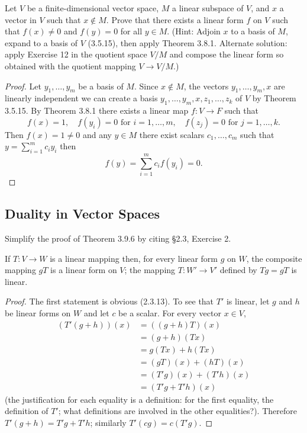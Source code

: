 \begin{tcolorbox}[title=Exercise 13, breakable]
    Let $V$ be a finite-dimensional vector space, $M$ a linear subspace of $V$, 
    and $x$ a vector in $V$ such that $x \notin M$. Prove that there exists a linear 
    form $f$ on $V$ such that $f(x) \ne 0$ and $f(y) = 0$ for all $y \in M$. 
    (Hint: Adjoin $x$ to a basis of $M$, expand to a basis of $V$ (3.5.15), then apply 
    Theorem 3.8.1. Alternate solution: apply Exercise 12 in the quotient 
    space $V/M$ and compose the linear form so obtained with the quotient 
    mapping $V \to V/M$.)
\end{tcolorbox}

\begin{proof}
    Let $y_1, \ldots, y_m$ be a basis of $M$. Since $x \notin M$, the vectors
    $y_1, \ldots, y_m, x$ are linearly independent we can create a basis
    $y_1, \ldots, y_m, x, z_1, \ldots, z_k$ of $V$ by Theorem 3.5.15.
    By Theorem 3.8.1 there exists a linear map $f : V \to F$ such that 
    \[f(x) = 1, \quad f(y_i) = 0 \text{ for } i = 1, \ldots, m, \quad f(z_j) = 0 \text{ for } j = 1, \ldots, k.\]
    Then $f(x) = 1 \ne 0$ and any $y \in M$ there exist scalars $c_1, \ldots, c_m$ such that
    $y = \sum_{i=1}^m c_i y_i$ then
    \[f(y) = \sum_{i=1}^m c_i f(y_i) = 0.\]
\end{proof}

\subsection{Duality in Vector Spaces}

\begin{tcolorbox}[title=Exercise 1, breakable]
    Simplify the proof of Theorem 3.9.6 by citing \S 2.3, Exercise 2.
\end{tcolorbox}

\begin{theorem}
    If $T : V \longrightarrow W$ is a linear mapping then, for every linear form 
    $g$ on $W$, the composite mapping $gT$ is a linear form on $V$; the mapping 
    $T : W' \longrightarrow V'$ defined by $Tg = gT$ is linear.
\end{theorem}

\begin{proof}
The first statement is obvious (2.3.13). To see that $T'$ is linear, let $g$ and $h$ be linear forms on $W$ and let $c$ be a scalar. For every vector $x \in V$,
\begin{align*}
(T'(g + h))(x) &= ((g + h)T)(x) \\
&= (g + h)(Tx) \\
&= g(Tx) + h(Tx) \\
&= (gT)(x) + (hT)(x) \\
&= (T'g)(x) + (T'h)(x) \\
&= (T'g + T'h)(x)
\end{align*}
(the justification for each equality is a definition: for the first equality, the definition of $T'$; what definitions are involved in the other equalities?). Therefore $T'(g + h) = T'g + T'h$; similarly $T'(cg) = c(T'g)$.
\end{proof}

